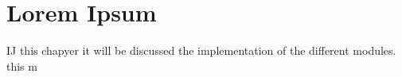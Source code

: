 
%

\chapter{Lorem Ipsum}
\label{cha:lorem_ipsum}

IJ this chapyer it will be discussed the implementation of the different modules. this m
